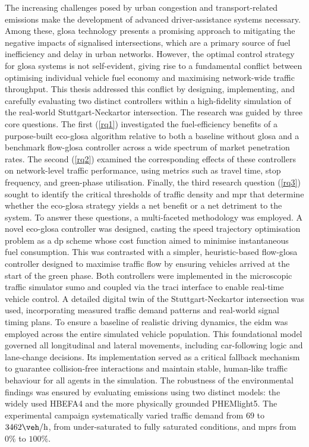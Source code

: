 The increasing challenges posed by urban congestion and transport-related emissions make the development of advanced driver-assistance systems necessary. Among these, \ac{glosa} technology presents a promising approach to mitigating the negative impacts of signalised intersections, which are a primary source of fuel inefficiency and delay in urban networks. However, the optimal control strategy for \ac{glosa} systems is not self-evident, giving rise to a fundamental conflict between optimising individual vehicle fuel economy and maximising network-wide traffic throughput. This thesis addressed this conflict by designing, implementing, and carefully evaluating two distinct controllers within a high-fidelity simulation of the real-world Stuttgart-Neckartor intersection.
\mynewline
The research was guided by three core questions. The first (\vref{rq1}) investigated the fuel-efficiency benefits of a purpose-built \ac{eco-glosa} algorithm relative to both a baseline without \ac{glosa} and a benchmark \ac{flow-glosa} controller across a wide spectrum of market penetration rates. The second (\vref{rq2}) examined the corresponding effects of these controllers on network-level traffic performance, using metrics such as travel time, stop frequency, and green-phase utilisation. Finally, the third research question (\vref{rq3}) sought to identify the critical thresholds of traffic density and \ac{mpr} that determine whether the \ac{eco-glosa} strategy yields a net benefit or a net detriment to the system.
\mynewline
To answer these questions, a multi-faceted methodology was employed. A novel \ac{eco-glosa} controller was designed, casting the speed trajectory optimisation problem as a \ac{dp} scheme whose cost function aimed to minimise instantaneous fuel consumption. This was contrasted with a simpler, heuristic-based \ac{flow-glosa} controller designed to maximise traffic flow by ensuring vehicles arrived at the start of the green phase. Both controllers were implemented in the microscopic traffic simulator \ac{sumo} and coupled via the \ac{traci} interface to enable real-time vehicle control. A detailed digital twin of the Stuttgart-Neckartor intersection was used, incorporating measured traffic demand patterns and real-world signal timing plans. To ensure a baseline of realistic driving dynamics, the \ac{eidm} was employed across the entire simulated vehicle population. This foundational model governed all longitudinal and lateral movements, including car-following logic and lane-change decisions. Its implementation served as a critical fallback mechanism to guarantee collision-free interactions and maintain stable, human-like traffic behaviour for all agents in the simulation. The robustness of the environmental findings was ensured by evaluating emissions using two distinct models: the widely used HBEFA4 and the more physically grounded PHEMlight5. The experimental campaign systematically varied traffic demand from $69$ to $3462\unit{\veh\per\hour}$, from under-saturated to fully saturated conditions, and \acp{mpr} from $0\%$ to $100\%$.
